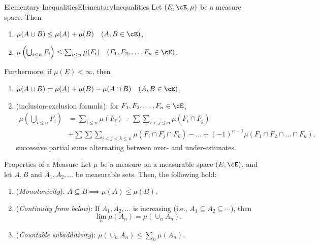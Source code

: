 \begin{lem}{Elementary Inequalities}{ElementaryInequalities}
	Let \((E, \cE, \mu)\) be a measure space. Then
	\begin{enumerate}[label=(\alph*)]
		\item \(\mu(A \cup B) \le \mu(A) + \mu(B) \quad (A, B \in \cE)\),
		\item \(\mu\left(\bigcup_{i \le n} F_i\right) \le \sum_{i \le n} \mu(F_i) \quad (F_1, F_2, \dots, F_n \in \cE)\).
	\end{enumerate}
	Furthermore, if \(\mu(E) < \infty\), then
	\begin{enumerate}[label=(\alph*), resume]
		\item \(\mu(A \cup B) = \mu(A) + \mu(B) - \mu(A \cap B) \quad (A, B \in \cE)\),
		\item (inclusion-exclusion formula): for \(F_1, F_2, \dots, F_n \in \cE\),
		      \begin{align*}
			      \mu\left(\bigcup_{i \le n} F_i\right) & = \sum_{i \le n} \mu(F_i) - \sum \sum_{i < j \le n} \mu(F_i \cap F_j)                                                     \\
			                                            & + \sum \sum \sum_{i < j < k \le n} \mu(F_i \cap F_j \cap F_k) - \dots + (-1)^{n-1} \mu(F_1 \cap F_2 \cap \dots \cap F_n),
		      \end{align*}
		      successive partial sums alternating between over- and under-estimates.
	\end{enumerate}
\end{lem}

\begin{prop}{Properties of a Measure}{}
	Let \(\mu\) be a measure on a measurable space \((E, \cE)\), and let \(A, B\) and \(A_1, A_2, \dots\) be measurable sets. Then, the following hold:
	\begin{enumerate}
		\item (\textit{Monotonicity}): \(A \subseteq B \implies \mu(A) \le \mu(B)\).
		\item (\textit{Continuity from below}): If \(A_1, A_2, \dots\) is increasing (i.e., \(A_1 \subseteq A_2 \subseteq \cdots\)), then
		      \begin{equation*}
			      \lim_n \mu(A_n) = \mu(\cup_n A_n).
		      \end{equation*}
		\item (\textit{Countable subadditivity}): \(\mu(\cup_n A_n) \le \sum_n \mu(A_n)\).
	\end{enumerate}
\end{prop}

